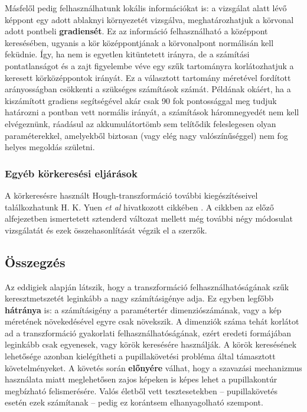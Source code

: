 Másfelől pedig felhasználhatunk lokális információkat is: a vizsgálat alatt lévő képpont egy adott ablaknyi környezetét vizsgálva, meghatározhatjuk a körvonal adott pontbeli \textbf{gradiensét}. Ez az információ felhasználható a középpont keresésében, ugyanis a kör középpontjának a körvonalpont normálisán kell feküdnie. Így, ha nem is egyetlen kitüntetett irányra, de a számítási pontatlanságot és a zajt figyelembe véve egy szűk tartományra korlátozhatjuk a keresett körközéppontok irányát. Ez a választott tartomány méretével fordított arányosságban csökkenti a szükséges számítások számát. Példának okáért, ha a kiszámított gradiens segítségével akár csak 90 fok pontossággal meg tudjuk határozni a pontban vett normális irányát, a számítások háromnegyedét nem kell elvégeznünk, ráadásul az akkumulátortömb sem telítődik feleslegesen olyan paraméterekkel, amelyekből biztosan (vagy elég nagy valószínűséggel) nem fog helyes megoldás születni.

\subsubsection{Egyéb körkeresési eljárások}\label{sect:korok_kiegeszites}

A körkeresésre használt Hough-transzformáció további kiegészítéseivel találkozhatunk H. K. Yuen \textit{et al} hivatkozott cikkében \cite{hough_circles}. A cikkben az előző alfejezetben ismertetett sztenderd változat mellett még további négy módosulat vizsgálatát és ezek összehasonlítását végzik el a szerzők.

\subsection{Összegzés}\label{sect:hough_osszefoglalas}

Az eddigiek alapján látszik, hogy a transzformáció felhasználhatóságának szűk keresztmetszetét leginkább a nagy számításigénye adja. Ez egyben legfőbb \textbf{hátránya} is: a számításigény a paramétertér dimenziószámának, vagy a kép méretének növekedésével egyre csak növekszik. A dimenziók száma tehát korlátot ad a transzformáció gyakorlati felhasználhatóságának, ezért eredeti formájában leginkább csak egyenesek, vagy körök keresésére használják. A körök keresésének lehetősége azonban kielégítheti a pupillakövetési probléma által támasztott követelményeket. A követés során \textbf{előnyére} válhat, hogy a szavazási mechanizmus használata miatt meglehetősen zajos képeken is képes lehet a pupillakontúr megbízható felismerésére. Valós életből vett tesztesetekben -- pupillakövetés esetén ezek számítanak -- pedig ez korántsem elhanyagolható szempont.


